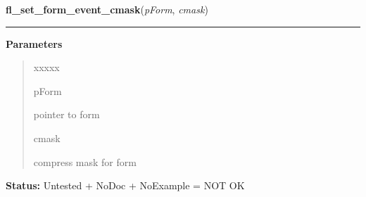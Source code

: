\hspace{.8\funcindent}\begin{boxedminipage}{\funcwidth}

    \raggedright \textbf{fl\_set\_form\_event\_cmask}(\textit{pForm}, \textit{cmask})

    \vspace{-1.5ex}

    \rule{\textwidth}{0.5\fboxrule}
\setlength{\parskip}{2ex}
\setlength{\parskip}{1ex}
      \textbf{Parameters}
      \vspace{-1ex}

      \begin{quote}
        \begin{Ventry}{xxxxx}

          \item[pForm]

          pointer to form

          \item[cmask]

          compress mask for form

        \end{Ventry}

      \end{quote}

\textbf{Status:} Untested + NoDoc + NoExample = NOT OK



    \end{boxedminipage}

    \label{xformslib:library:fl_get_form_event_cmask}

    \vspace{0.5ex}

